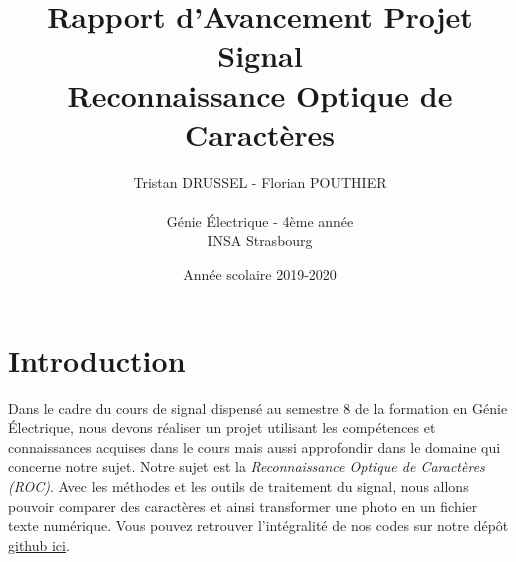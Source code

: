 \documentclass[a4paper,12pt,titlepage]{report}
\title{Rapport d'Avancement Projet Signal\\Reconnaissance Optique de Caractères}
\author{Tristan DRUSSEL - Florian POUTHIER \\ \\ Génie Électrique - 4ème année\\ INSA Strasbourg}
\date{Année scolaire 2019-2020}
\begin{document}
	\begin{titlepage}
		\maketitle
	\end{titlepage}
	\tableofcontents
	\newpage
	\section*{Introduction}
		Dans le cadre du cours de signal dispensé au semestre 8 de la formation en Génie Électrique, nous devons réaliser un projet utilisant les compétences et connaissances acquises dans le cours mais aussi approfondir dans le domaine qui concerne notre sujet.
		Notre sujet est la \textit{Reconnaissance Optique de Caractères (ROC)}. Avec les méthodes et les outils de traitement du signal, nous allons pouvoir comparer des caractères et ainsi transformer une photo en un fichier texte numérique. Vous pouvez retrouver l'intégralité de nos codes sur notre dépôt \href{https://github.com/tristanplouz/ProjetSignal}{github ici}.
\end{document}
